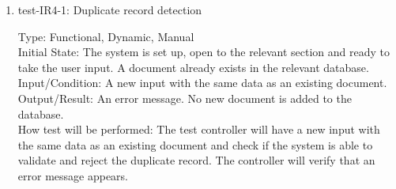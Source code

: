 \documentclass[12pt, titlepage]{article}
\begin{document}
\begin{enumerate}
    

    \item{test-IR4-1}: Duplicate record detection \label{test-IR4-1}
    
    Type: Functional, Dynamic, Manual\\
    
    Initial State: The system is set up, open to the relevant section and ready to take the user input. A document already exists in the relevant database.\\
    
    Input/Condition: A new input with the same data as an existing document.\\
    
    Output/Result: An error message. No new document is added to the database.\\
    
    How test will be performed: The test controller will have a new input with the same data as an existing document and check if the system is able to validate and reject the duplicate record. The controller will verify that an error message appears.

    
    
    
    
    


\end{enumerate}
\end{document}
